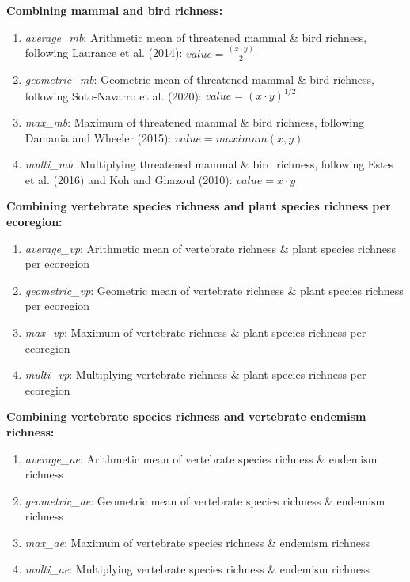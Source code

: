 \documentclass[
]{article}
\providecommand{\tightlist}{%
  \setlength{\itemsep}{0pt}\setlength{\parskip}{0pt}}
\begin{document}
\newpage

\textbf{Combining mammal and bird richness:}

\begin{enumerate}
\def\labelenumi{(\arabic{enumi})}
\setcounter{enumi}{24}
\tightlist
\item
  \emph{average\_mb}: Arithmetic mean of threatened mammal \& bird richness, following Laurance et al. (2014): \(value = \frac{(x \cdot y)}{2}\)
\item
  \emph{geometric\_mb}: Geometric mean of threatened mammal \& bird richness, following Soto-Navarro et al. (2020): \(value = (x \cdot y)^{1/2}\)
\item
  \emph{max\_mb}: Maximum of threatened mammal \& bird richness, following Damania and Wheeler (2015): \(value = maximum (x,y)\)
\item
  \emph{multi\_mb}: Multiplying threatened mammal \& bird richness, following Estes et al. (2016) and Koh and Ghazoul (2010): \(value = x \cdot y\)
\end{enumerate}

\textbf{Combining vertebrate species richness and plant species richness per ecoregion:}

\begin{enumerate}
\def\labelenumi{(\arabic{enumi})}
\setcounter{enumi}{28}
\tightlist
\item
  \emph{average\_vp}: Arithmetic mean of vertebrate richness \& plant species richness per ecoregion
\item
  \emph{geometric\_vp}: Geometric mean of vertebrate richness \& plant species richness per ecoregion
\item
  \emph{max\_vp}: Maximum of vertebrate richness \& plant species richness per ecoregion
\item
  \emph{multi\_vp}: Multiplying vertebrate richness \& plant species richness per ecoregion
\end{enumerate}

\textbf{Combining vertebrate species richness and vertebrate endemism richness:}

\begin{enumerate}
\def\labelenumi{(\arabic{enumi})}
\setcounter{enumi}{32}
\tightlist
\item
  \emph{average\_ae}: Arithmetic mean of vertebrate species richness \& endemism richness
\item
  \emph{geometric\_ae}: Geometric mean of vertebrate species richness \& endemism richness
\item
  \emph{max\_ae}: Maximum of vertebrate species richness \& endemism richness
\item
  \emph{multi\_ae}: Multiplying vertebrate species richness \& endemism richness
\end{enumerate}
\end{document}
